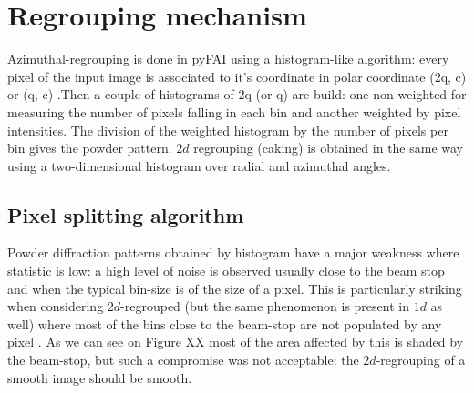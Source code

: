 \documentclass[a4paper]{jpconf}
\begin{document}
\section{Regrouping mechanism} 
Azimuthal-regrouping is done in pyFAI using a histogram-like algorithm: every
pixel of the input image is associated to it's coordinate in polar coordinate
(2q, c) or (q, c) .Then a couple of histograms of 2q (or q) are build: one non 
weighted for measuring the number of pixels falling in each bin and another
weighted by pixel  intensities. The division of the weighted histogram by the
number of  pixels per bin gives the powder pattern.  $2d$ regrouping (caking)  is
obtained in the same way using a two-dimensional histogram over radial and
azimuthal  angles.

\subsection{Pixel splitting algorithm}
Powder diffraction patterns obtained by histogram have a major weakness where
statistic is low: a high level of  noise is observed usually close to the beam
stop and when the typical bin-size  is of the size of a pixel. This is
particularly striking when considering  $2d$-regrouped (but the same phenomenon is
present in  $1d$ as well) where most of the bins close to the beam-stop are not
populated by  any pixel . As we can see on Figure XX most of the area affected
by this is  shaded by the beam-stop, but such a compromise was not acceptable:
the  $2d$-regrouping of a smooth image should be smooth.
\end{document}
